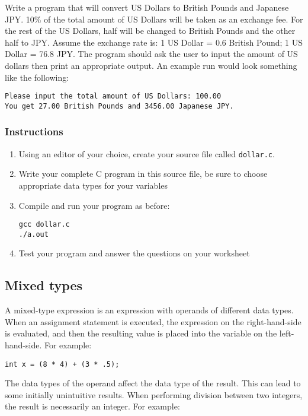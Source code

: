 \documentclass[12pt]{scrartcl}
\begin{document}
Write a program that will convert US Dollars to British Pounds and 
Japanese JPY.  10\% of the total amount of US Dollars will be taken 
as an exchange fee.  For the rest of the US Dollars, half will be 
changed to British Pounds and the other half to JPY.  Assume the 
exchange rate is: 1 US Dollar = 0.6 British Pound; 1 US Dollar = 
76.8 JPY.  The program should ask the user to input the amount 
of US dollars then print an appropriate output.  An example run 
would look something like the following:

\begin{verbatim}
Please input the total amount of US Dollars: 100.00
You get 27.00 British Pounds and 3456.00 Japanese JPY.
\end{verbatim}

\subsubsection*{Instructions}

\begin{enumerate}
  \item Using an editor of your choice, create your source file 
	called \texttt{dollar.c}.
  \item Write your complete C program in this source file, be sure 
  	to choose appropriate data types for your variables
  \item Compile and run your program as before:
	
\begin{verbatim}
gcc dollar.c
./a.out
\end{verbatim}
  \item Test your program and answer the questions on your worksheet
\end{enumerate} 

\subsection{Mixed types}

A mixed-type expression is an expression with operands of different 
data types. When an assignment statement is executed, the expression 
on the right-hand-side is evaluated, and then the resulting value is 
placed into the variable on the left-hand-side.  For example:

\begin{verbatim}
int x = (8 * 4) + (3 * .5);
\end{verbatim}

The data types of the operand affect the data type of the result.  This 
can lead to some initially unintuitive results.  When performing division 
between two integers, the result is necessarily an integer.  For example:
\end{document}
